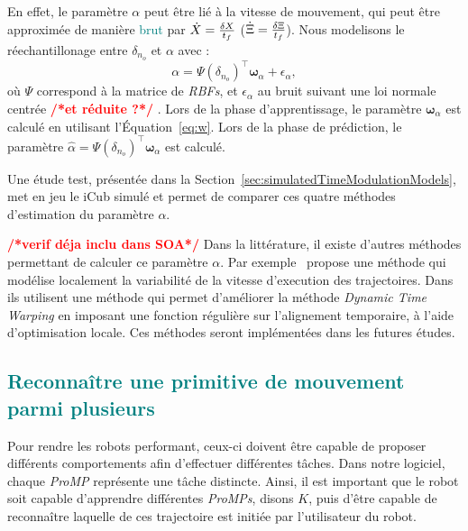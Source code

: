\documentclass[utf8]{frontiersSCNS} %
\newcommand{\toimprove}[1]{\textcolor{teal}{#1}}
\newcommand{\todo}[1]{\textcolor{red}{\textbf{/*#1*/}}}
\begin{document}
En effet, le paramètre $\alpha$ peut être lié à la vitesse de mouvement, qui peut être approximée de manière \toimprove{brut} par $\dot{X} ={ \delta X  \over t_f}$ ($\dot{\Xi} ={ \delta \Xi  \over t_f}$). Nous modelisons le réechantillonage entre $\delta_{n_o}$ et $\alpha$ avec : 
\begin{equation}
\label{eq:model}
\alpha = \Psi(\delta_{n_o})^\top \boldsymbol{\omega}_\alpha + \epsilon_\alpha,
\end{equation} 
où $\Psi$ correspond à la matrice de \textit{RBFs}, et $\epsilon_\alpha$ au bruit suivant une loi normale centrée \todo{et réduite ?} .
Lors de la phase d'apprentissage, le paramètre $\boldsymbol{\omega}_\alpha$ est calculé en utilisant l’Équation~\ref{eq:w}. 
Lors de la phase de prédiction, le paramètre $\hat{\alpha} = \Psi(\delta_{n_o})^\top \boldsymbol{\omega}_\alpha$ est calculé.

Une étude test, présentée dans la Section~\ref{sec:simulatedTimeModulationModels}, met en jeu le iCub simulé et permet de comparer ces quatre méthodes d'estimation du paramètre  $\alpha$.

\todo{verif déja inclu dans SOA}
Dans la littérature, il existe d'autres méthodes permettant de calculer ce paramètre $\alpha$. Par exemple~ \cite{ewerton2015learning} propose une méthode qui modélise localement la variabilité de la vitesse d'execution des trajectoires. Dans~\cite{maeda2016probabilistic} ils utilisent une méthode qui permet d'améliorer la méthode \textit{Dynamic Time Warping} en imposant une fonction régulière sur l’alignement temporaire, à l'aide d'optimisation locale. Ces méthodes seront implémentées dans les futures études.


\subsection{\toimprove{Reconnaître une primitive de mouvement parmi plusieurs}}
\label{sec:ManyProMP}
%
%
Pour rendre les robots performant, ceux-ci doivent être capable de proposer différents comportements afin d'effectuer différentes tâches.  Dans notre logiciel, chaque \textit{ProMP} représente une tâche distincte.
Ainsi, il est important que le robot soit capable d'apprendre différentes \textit{ProMPs}, disons $K$, puis d'être capable de reconnaître laquelle de ces trajectoire est initiée par l'utilisateur du robot.
\end{document}
